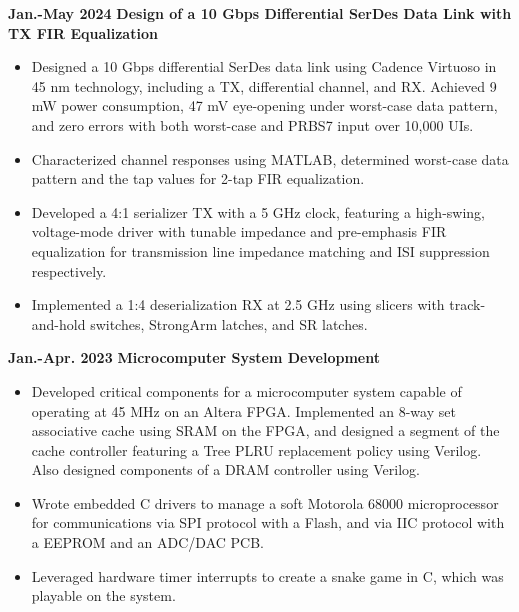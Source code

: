 \documentclass[11pt,a4paper,sans]{moderncv}
\begin{document}
\cventry
{\textnormal{\textbf{Jan.-May 2024}}}
{\textnormal{\textbf{Design of a 10 Gbps Differential SerDes Data Link with TX FIR Equalization}}}
{}{}{}
{
    \begin{itemize}
        \item Designed a 10 Gbps differential SerDes data link using Cadence Virtuoso in 45 nm technology, including a TX, differential channel, and RX. Achieved 9 mW power consumption, 47 mV eye-opening under worst-case data pattern, and zero errors with both worst-case and PRBS7 input over 10,000 UIs.
        \item Characterized channel responses using MATLAB, determined worst-case data pattern and the tap values for 2-tap FIR equalization.
        \item Developed a 4:1 serializer TX with a 5 GHz clock, featuring a high-swing, voltage-mode driver with tunable impedance and pre-emphasis FIR equalization for transmission line impedance matching and ISI suppression respectively.
        \item Implemented a 1:4 deserialization RX at 2.5 GHz using slicers with track-and-hold switches, StrongArm latches, and SR latches.
    \end{itemize}
}

\cventry
{\textnormal{\textbf{Jan.-Apr. 2023}}}
{\textnormal{\textbf{Microcomputer System Development}}}
{}{}{}
{
    \begin{itemize}
    \item Developed critical components for a microcomputer system capable of operating at 45 MHz on an Altera FPGA. Implemented an 8-way set associative cache using SRAM on the FPGA, and designed a segment of the cache controller featuring a Tree PLRU replacement policy using Verilog. Also designed components of a DRAM controller using Verilog.
    \item Wrote embedded C drivers to manage a soft Motorola 68000 microprocessor for communications via SPI protocol with a Flash, and via IIC protocol with a EEPROM and an ADC/DAC PCB.
    \item Leveraged hardware timer interrupts to create a snake game in C, which was playable on the system.
    \end{itemize}
}

\end{document}
